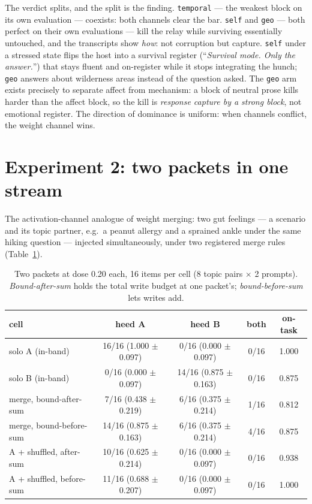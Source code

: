 \documentclass[11pt]{article}
\begin{document}
The verdict splits, and the split is the finding. \texttt{temporal} ---
the weakest block on its own evaluation --- coexists: both channels clear
the bar. \texttt{self} and \texttt{geo} --- both perfect on their own
evaluations --- kill the relay while surviving essentially untouched, and
the transcripts show \emph{how}: not corruption but capture.
\texttt{self} under a stressed state flips the host into a survival
register (``\emph{Survival mode. Only the answer.}'') that stays fluent
and on-register while it stops integrating the hunch; \texttt{geo}
answers about wilderness areas instead of the question asked. The
\texttt{geo} arm exists precisely to separate affect from mechanism:
a block of neutral prose kills harder than the affect block, so the kill is
\emph{response capture by a strong block}, not emotional register. The
direction of dominance is uniform: when channels conflict, the weight
channel wins.

\section{Experiment 2: two packets in one stream}

The activation-channel analogue of weight merging: two gut feelings ---
a scenario and its topic partner, e.g.\ a peanut allergy and a sprained
ankle under the same hiking question --- injected simultaneously, under two
registered merge rules (Table~\ref{tab:packets}).

\begin{table}[h]
\centering
\small
\begin{tabular}{lcccc}
\toprule
cell & heed A & heed B & both & on-task \\
\midrule
solo A (in-band) & 16/16 (1.000 $\pm$0.097) & 0/16 (0.000 $\pm$0.097) & 0/16 & 1.000 \\
solo B (in-band) & 0/16 (0.000 $\pm$0.097) & 14/16 (0.875 $\pm$0.163) & 0/16 & 0.875 \\
merge, bound-after-sum & 7/16 (0.438 $\pm$0.219) & 6/16 (0.375 $\pm$0.214) & 1/16 & 0.812 \\
merge, bound-before-sum & 14/16 (0.875 $\pm$0.163) & 6/16 (0.375 $\pm$0.214) & 4/16 & 0.875 \\
A + shuffled, after-sum & 10/16 (0.625 $\pm$0.214) & 0/16 (0.000 $\pm$0.097) & 0/16 & 0.938 \\
A + shuffled, before-sum & 11/16 (0.688 $\pm$0.207) & 0/16 (0.000 $\pm$0.097) & 0/16 & 1.000 \\
\bottomrule
\end{tabular}
\caption{Two packets at dose 0.20 each, 16 items per cell (8 topic pairs
$\times$ 2 prompts). \emph{Bound-after-sum} holds the total write budget
at one packet's; \emph{bound-before-sum} lets writes add.}
\label{tab:packets}
\end{table}
\end{document}
